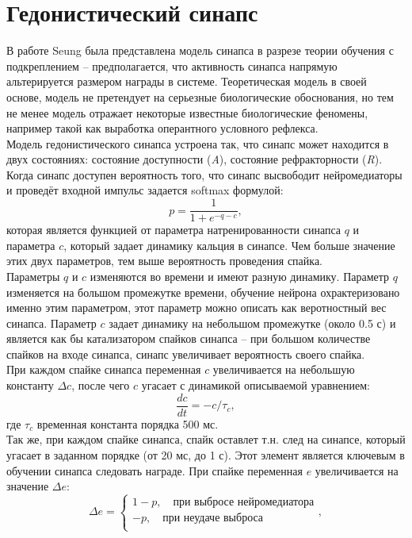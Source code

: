 \documentclass[a4paper,10pt,usenames]{article}
\begin{document}
\section{Гедонистический синапс}
\indent В работе Seung\cite{seung2003learning} была представлена модель синапса в разрезе теории обучения с подкреплением -- предполагается, что активность синапса напрямую альтерируется размером награды в системе. Теоретическая модель в своей основе, модель не претендует на серьезные биологические обоснования, но тем не менее модель отражает некоторые известные биологические феномены, например такой как выработка оперантного условного рефлекса.\\
\indent Модель гедонистического синапса устроена так, что синапс может находится в двух состояниях: состояние доступности (\textit{A}), состояние рефракторности (\textit{R}). Когда синапс доступен вероятность того, что синапс высвободит нейромедиаторы и проведёт входной импульс задается softmax формулой:
\begin{equation*}
p = \frac{1}{1 + e^{-q-c}},
\end{equation*}
которая является функцией от параметра натренированности синапса $q$ и параметра $c$, который задает динамику кальция в синапсе. Чем больше значение этих двух параметров, тем выше вероятность проведения спайка.\\
\indent Параметры $q$ и $c$ изменяются во времени и имеют разную динамику. Параметр $q$ изменяется на большом промежутке времени, обучение нейрона охрактеризовано именно этим параметром, этот параметр можно описать как веротностный вес синапса. Параметр $c$ задает динамику на небольшом промежутке (около 0.5 с) и является как бы катализатором спайков синапса -- при большом количестве спайков на входе синапса, синапс увеличивает вероятность своего спайка.\\
\indent При каждом спайке синапса переменная $c$ увеличивается на небольшую константу $\Delta c$, после чего $c$ угасает с динамикой описываемой уравнением:
\begin{equation}\label{eq:decay}
\frac{dc}{dt} = - c / \tau_{c},
\end{equation} 
где $\tau_{c}$ временная константа порядка 500 мс.\\
\indent Так же, при каждом спайке синапса, спайк оставлет т.н. след на синапсе, который угасает в заданном порядке (от 20 мс, до 1 с). Этот элемент является ключевым в обучении синапса следовать награде. При спайке переменная $e$ увеличивается на значение $\Delta e$:
\begin{equation}\label{eq:delta_e}
\Delta e = \begin{cases} 1-p, \quad \text{при выбросе нейромедиатора} \\ -p, \quad \text{при неудаче выброса} \\ \end{cases},
\end{equation}
\end{document}
